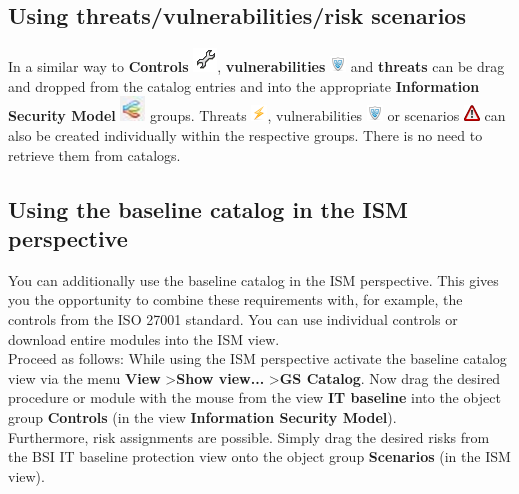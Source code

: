 \documentclass[a4paper,10pt]{book}
\begin{document}
\subsection{Using threats/vulnerabilities/risk scenarios}
In a similar way to \textbf{Controls} \includegraphics[height=2ex]{Icon/Controls.png}, \textbf{vulnerabilities} \includegraphics[height=2ex]{Icon/Schwachstellen.png} and
\textbf{threats} can be drag and dropped from the catalog entries and into the appropriate \textbf{Information Security Model} \includegraphics[height=2ex]{Icon/Informationssicherheitsmodell.png}
groups.
Threats \includegraphics[height=2ex]{Icon/Lightening.png}, vulnerabilities \includegraphics[height=2ex]{Icon/Schwachstellen.png} or scenarios \includegraphics[height=2ex]{Icon/Szenarios.png}
can also be created individually within the respective groups. There is no need to retrieve them from catalogs.

\subsection{Using the baseline catalog in the ISM perspective}
You can additionally use the baseline catalog in the ISM perspective. This gives you the opportunity to combine these requirements with, for example,
the controls from the ISO 27001 standard. You can use individual controls or download entire modules into the ISM view.
\newline\\
Proceed as follows: While using the ISM perspective activate the baseline catalog view via the menu \textbf{View} \textgreater \textbf{Show view...} \textgreater \textbf{GS Catalog}.
Now drag the desired procedure or module with the mouse from the view \textbf{IT baseline} into the object group \textbf{Controls} (in the view \textbf{Information Security Model}).
\newline\\
Furthermore, risk assignments are possible. Simply drag the desired risks from the BSI IT baseline protection view onto the object group \textbf{Scenarios} (in the ISM view).
\end{document}
